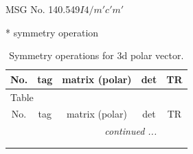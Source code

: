 \documentclass[fleqn,8pt]{jsarticle}
\begin{document}
\setcounter{MaxMatrixCols}{32}

\renewcommand{\tablename}{Table~}
\renewcommand{\figurename}{Figure~}
\begin{center}
\LARGE
MSG No. 140.549\quad$I4/m'c'm'$
\end{center}
* symmetry operation
\renewcommand{\arraystretch}{1.3}
\begin{longtable}{ccccc}
\caption{Symmetry operations for 3d polar vector.}
 \\
 \hline \hline
No. & tag & matrix (polar) & det & TR \\ \hline \endfirsthead

\multicolumn{4}{l}{\tablename\ \thetable{}} \\
 \hline \hline
No. & tag & matrix (polar) & det & TR \\ \hline \endhead

 \hline \hline
\multicolumn{4}{r}{\footnotesize\it continued ...} \\ \endfoot

 \hline \hline
\multicolumn{4}{r}{} \\ \endlastfoot


\end{longtable}
\end{document}
